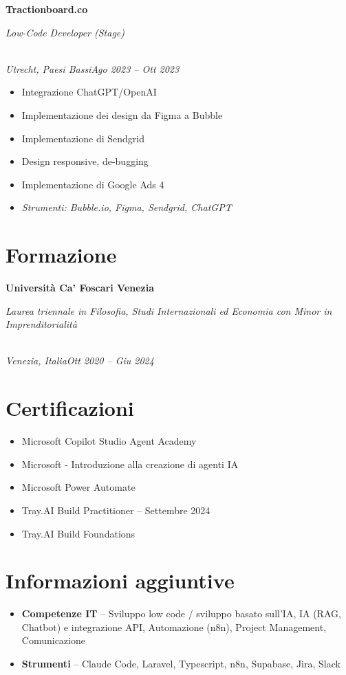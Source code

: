 \documentclass[a4paper,10pt]{article}
\newcommand{\role}[4]{\vspace{3pt}\noindent\hspace{0.6em}\parbox[t]{0.38\textwidth}{\raggedright\textbf{#1}}\hfill\parbox[t]{0.58\textwidth}{\raggedleft\textit{#2}}\\{\textit{#3}\hfill\textit{#4}}\vspace{1pt}}
\begin{document}
\role{Tractionboard.co}{Low-Code Developer (Stage)}{Utrecht, Paesi Bassi}{Ago 2023 -- Ott 2023}
\begin{itemize}
\item Integrazione ChatGPT/OpenAI
\item Implementazione dei design da Figma a Bubble
\item Implementazione di Sendgrid
\item Design responsive, de-bugging
\item Implementazione di Google Ads 4
\item \textit{Strumenti: Bubble.io, Figma, Sendgrid, ChatGPT}
\end{itemize}

\section{Formazione}
\role{Universit\`a Ca' Foscari Venezia}{Laurea triennale in Filosofia, Studi Internazionali ed Economia con Minor in Imprenditorialit\`a}{Venezia, Italia}{Ott 2020 -- Giu 2024}

\section{Certificazioni}
\begin{itemize}
\item Microsoft Copilot Studio Agent Academy
\item Microsoft - Introduzione alla creazione di agenti IA
\item Microsoft Power Automate
\item Tray.AI Build Practitioner -- Settembre 2024
\item Tray.AI Build Foundations
\end{itemize}

\section{Informazioni aggiuntive}
\begin{itemize}
\item \textbf{Competenze IT} -- Sviluppo low code / sviluppo basato sull'IA, IA (RAG, Chatbot) e integrazione API, Automazione (n8n), Project Management, Comunicazione
\item \textbf{Strumenti} -- Claude Code, Laravel, Typescript, n8n, Supabase, Jira, Slack
\end{itemize}
\end{document}
